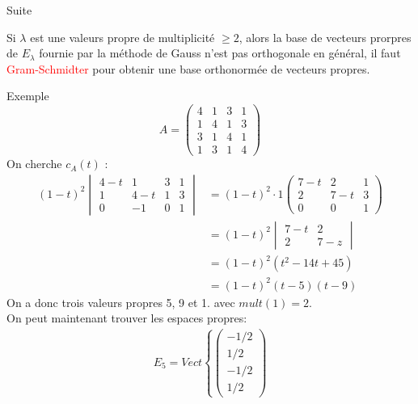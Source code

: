 
\begin{parag}{Suite}

    
\begin{framedremark}
    Si $\lambda$ est une valeurs propre de multiplicité $\geq 2$, alors la base de vecteurs prorpres de $E_\lambda$ fournie par la méthode de Gauss n'est pas orthogonale en général, il faut \textcolor{red}{Gram-Schmidter} pour obtenir une base orthonormée de vecteurs propres.
\end{framedremark}
\begin{subparag}{Exemple}
    \[A = \begin{pmatrix}
        4 & 1 & 3 & 1\\
        1 & 4 & 1 & 3\\
        3 & 1 & 4 & 1\\
        1 & 3 & 1 & 4
    \end{pmatrix}\]
    On cherche $c_A(t)$ :
    \begin{align*}
        (1-t)^2\begin{vmatrix}
            4-t & 1 & 3 & 1\\
            1 & 4-t & 1 & 3\\
            0 & -1 & 0 & 1
        \end{vmatrix} &= (1-t)^2\cdot1\begin{pmatrix}
            7-t & 2 & 1\\
            2 & 7-t & 3\\
            0 & 0 & 1
        \end{pmatrix}\\ 
        &= (1-t)^2\begin{vmatrix}
            7-t  & 2\\
            2 & 7-z
        \end{vmatrix} \\
        &= (1-t)^2(t^2 - 14t + 45)\\
        &= (1-t)^2(t-5)(t-9)
    \end{align*}
    On a donc trois valeurs propres 5, 9 et 1. avec $mult(1) = 2$.
    \\
    On peut maintenant trouver les espaces propres:
\begin{align*}
    E_5 = Vect\left\{\begin{pmatrix}
        -1/2\\
        1/2 \\ -1/2 \\ 1/2

\end{pmatrix}
\end{align*}
\end{subparag}
\end{parag}
